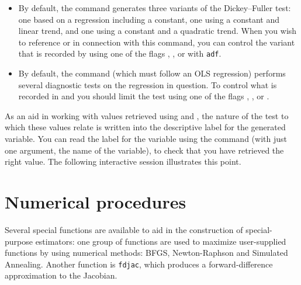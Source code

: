 \begin{itemize}
\item By default, the  command generates three variants of
  the Dickey--Fuller test: one based on a regression including a
  constant, one using a constant and linear trend, and one using a
  constant and a quadratic trend.  When you wish to reference
   or  in connection with this command, you
  can control the variant that is recorded by using one of the flags
  , ,  or  with
  \verb+adf+.
\item By default, the  command (which must follow an OLS
  regression) performs several diagnostic tests on the regression in
  question.  To control what is recorded in  and
   you should limit the test using one of the flags
  , ,  or
  .
\end{itemize}

As an aid in working with values retrieved using  and
, the nature of the test to which these values relate is
written into the descriptive label for the generated variable.  You
can read the label for the variable using the  command
(with just one argument, the name of the variable), to check that you
have retrieved the right value.  The following interactive session
illustrates this point.


\section{Numerical procedures}
\label{sec:genr-numerical}

Several special functions are available to aid in the construction of
special-purpose estimators: one group of functions are used to
maximize user-supplied functions by using numerical methods: BFGS,
Newton-Raphson and Simulated Annealing.  Another function is
\texttt{fdjac}, which produces a forward-difference approximation to
the Jacobian.

